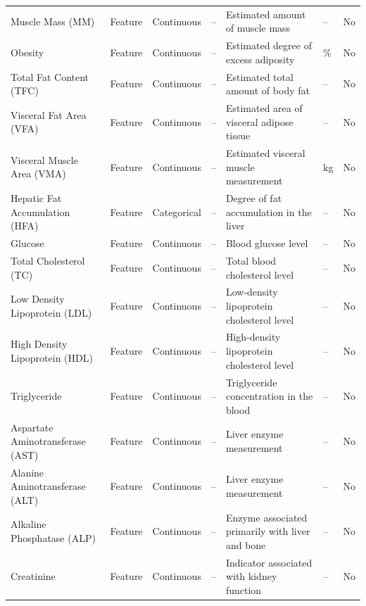 \begin{longtable}{
    p{4.0cm}
    p{1.3cm}
    p{1.6cm}
    p{1.4cm}
    p{5.0cm}
    p{1.0cm}
    p{1.2cm}
}
Muscle Mass (MM)
& Feature & Continuous & --
& Estimated amount of muscle mass
& -- & No \\

Obesity
& Feature & Continuous & --
& Estimated degree of excess adiposity
& \% & No \\

Total Fat Content (TFC)
& Feature & Continuous & --
& Estimated total amount of body fat
& -- & No \\

Visceral Fat Area (VFA)
& Feature & Continuous & --
& Estimated area of visceral adipose tissue
& -- & No \\

Visceral Muscle Area (VMA)
& Feature & Continuous & --
& Estimated visceral muscle measurement
& kg & No \\

Hepatic Fat Accumulation (HFA)
& Feature & Categorical & --
& Degree of fat accumulation in the liver
& -- & No \\

Glucose
& Feature & Continuous & --
& Blood glucose level
& -- & No \\

Total Cholesterol (TC)
& Feature & Continuous & --
& Total blood cholesterol level
& -- & No \\

Low Density Lipoprotein (LDL)
& Feature & Continuous & --
& Low-density lipoprotein cholesterol level
& -- & No \\

High Density Lipoprotein (HDL)
& Feature & Continuous & --
& High-density lipoprotein cholesterol level
& -- & No \\

Triglyceride
& Feature & Continuous & --
& Triglyceride concentration in the blood
& -- & No \\

Aspartate Aminotransferase (AST)
& Feature & Continuous & --
& Liver enzyme measurement
& -- & No \\

Alanine Aminotransferase (ALT)
& Feature & Continuous & --
& Liver enzyme measurement
& -- & No \\

Alkaline Phosphatase (ALP)
& Feature & Continuous & --
& Enzyme associated primarily with liver and bone
& -- & No \\

Creatinine
& Feature & Continuous & --
& Indicator associated with kidney function
& -- & No \\


\end{longtable}
